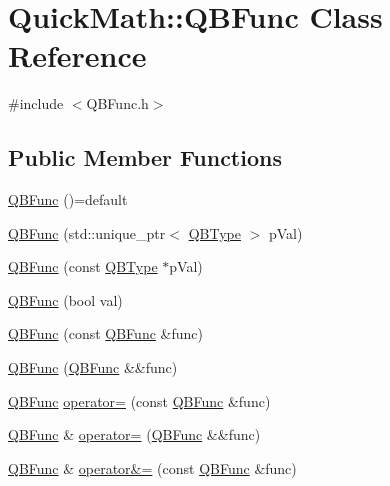 \hypertarget{classQuickMath_1_1QBFunc}{}\section{Quick\+Math\+:\+:Q\+B\+Func Class Reference}
\label{classQuickMath_1_1QBFunc}


{\ttfamily \#include $<$Q\+B\+Func.\+h$>$}

\subsection*{Public Member Functions}
\begin{DoxyCompactItemize}
\item 
\hyperlink{classQuickMath_1_1QBFunc_ab9f410bcd30f0096b51ddf2ecb4005f0}{Q\+B\+Func} ()=default
\item 
\hyperlink{classQuickMath_1_1QBFunc_abe40a3b2f47a147a3d6da555c058593b}{Q\+B\+Func} (std\+::unique\+\_\+ptr$<$ \hyperlink{classQuickMath_1_1QBType}{Q\+B\+Type} $>$ p\+Val)
\item 
\hyperlink{classQuickMath_1_1QBFunc_adca4b4fa0ce85f65c55d423a755af660}{Q\+B\+Func} (const \hyperlink{classQuickMath_1_1QBType}{Q\+B\+Type} $\ast$p\+Val)
\item 
\hyperlink{classQuickMath_1_1QBFunc_ac6ed36ac2f44e0c7e31df7838f6df9d6}{Q\+B\+Func} (bool val)
\item 
\hyperlink{classQuickMath_1_1QBFunc_a6e40b9a774151a60bd3821375376ea10}{Q\+B\+Func} (const \hyperlink{classQuickMath_1_1QBFunc}{Q\+B\+Func} \&func)
\item 
\hyperlink{classQuickMath_1_1QBFunc_a2938201b7b3e97644ececf58b040620a}{Q\+B\+Func} (\hyperlink{classQuickMath_1_1QBFunc}{Q\+B\+Func} \&\&func)
\item 
\hyperlink{classQuickMath_1_1QBFunc}{Q\+B\+Func} \hyperlink{classQuickMath_1_1QBFunc_a2161ea28eba3812d044c34ab4b4bce14}{operator=} (const \hyperlink{classQuickMath_1_1QBFunc}{Q\+B\+Func} \&func)
\item 
\hyperlink{classQuickMath_1_1QBFunc}{Q\+B\+Func} \& \hyperlink{classQuickMath_1_1QBFunc_a18fa3391066aba1c62ad8f29fe6a7c2b}{operator=} (\hyperlink{classQuickMath_1_1QBFunc}{Q\+B\+Func} \&\&func)
\item 
\hyperlink{classQuickMath_1_1QBFunc}{Q\+B\+Func} \& \hyperlink{classQuickMath_1_1QBFunc_a577c7d41b9b2ac1288b7f31a3cd2fda0}{operator\&=} (const \hyperlink{classQuickMath_1_1QBFunc}{Q\+B\+Func} \&func)
\item 

\end{DoxyCompactItemize}
